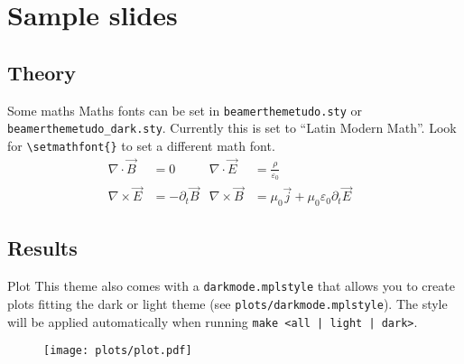\section{Sample slides}
\subsection{Theory}
\begin{frame}{Some maths}
  Maths fonts can be set in \texttt{beamerthemetudo.sty} or \texttt{beamerthemetudo\_dark.sty}.
  Currently this is set to \enquote{Latin Modern Math}. Look for \texttt{\textbackslash setmathfont\{\}}
  to set a different math font.
  \begin{align*}
    \nabla \cdot \vec{B} &= 0 &
    \nabla \cdot \vec{E} &= \frac{ρ}{ε_0} \\
    \nabla \times \vec{E} &= -\partial_t \vec{B} &
    \nabla \times \vec{B} &= μ_0 \vec{j} + μ_0 ε_0 \partial_t \vec{E} &
  \end{align*}
\end{frame}

\subsection{Results}
\begin{frame}{Plot}
    This theme also comes with a \texttt{darkmode.mplstyle} that allows you to create
    plots fitting the dark or light theme (see \texttt{plots/darkmode.mplstyle}). The style will
    be applied automatically when running \texttt{make <all | light | dark>}.
  \begin{figure}
    \centering
    \texttt{[image: plots/plot.pdf]}
  \end{figure}
\end{frame}